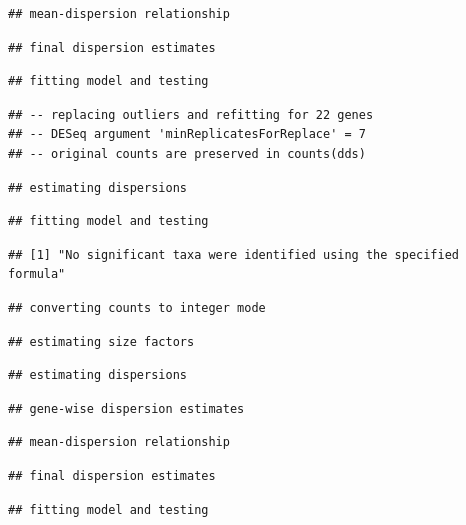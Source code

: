 \documentclass[]{article}
\begin{document}
\begin{verbatim}
## mean-dispersion relationship
\end{verbatim}

\begin{verbatim}
## final dispersion estimates
\end{verbatim}

\begin{verbatim}
## fitting model and testing
\end{verbatim}

\begin{verbatim}
## -- replacing outliers and refitting for 22 genes
## -- DESeq argument 'minReplicatesForReplace' = 7 
## -- original counts are preserved in counts(dds)
\end{verbatim}

\begin{verbatim}
## estimating dispersions
\end{verbatim}

\begin{verbatim}
## fitting model and testing
\end{verbatim}

\begin{verbatim}
## [1] "No significant taxa were identified using the specified formula"
\end{verbatim}

\begin{verbatim}
## converting counts to integer mode
\end{verbatim}

\begin{verbatim}
## estimating size factors
\end{verbatim}

\begin{verbatim}
## estimating dispersions
\end{verbatim}

\begin{verbatim}
## gene-wise dispersion estimates
\end{verbatim}

\begin{verbatim}
## mean-dispersion relationship
\end{verbatim}

\begin{verbatim}
## final dispersion estimates
\end{verbatim}

\begin{verbatim}
## fitting model and testing
\end{verbatim}
\end{document}
